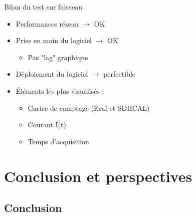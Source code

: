 \documentclass[8pt]{beamer}
\begin{document}
\begin{frame}
\begin{block}{Bilan du test sur faisceau}
\begin{minipage}{0.49\linewidth}
\begin{itemize}
          \item Performances réseau $\rightarrow$ OK
          \item Prise en main du logiciel $\rightarrow$ OK
          \begin{itemize}
            \item Pas "lag" graphique
          \end{itemize}
        \end{itemize}
      \end{minipage} \hfill
      \begin{minipage}{0.49\linewidth}
        \begin{itemize}
          \item Déploiement du logiciel $\rightarrow$ perfectible
          \item Éléments les plus visualisés :
          \begin{itemize}
            \item Cartes de comptage (Ecal et SDHCAL)
            \item Courant I(t)
            \item Temps d'acquisition
          \end{itemize}
        \end{itemize}
      \end{minipage}
    \end{block}
  \end{frame}














  \section{Conclusion et perspectives}

  \begin{frame}
  \frametitle{\secname}
    \tableofcontents[currentsection]
  \end{frame}

  \subsection*{Conclusion}
\end{document}
